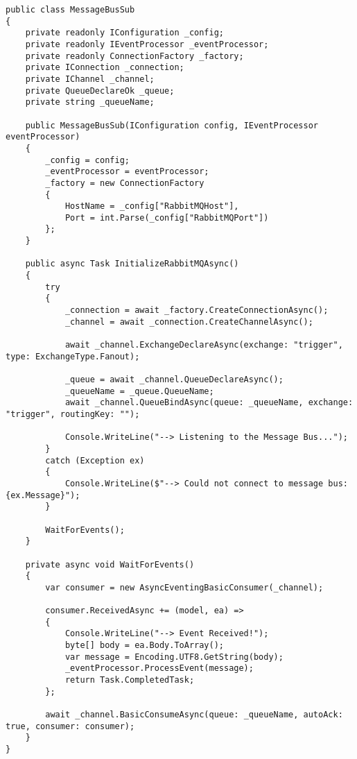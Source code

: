 \begin{lstlisting}[style=mystyleA, caption=MessageBusSub.cs (Microservice), label=lst:MicroMessageBusSb]
public class MessageBusSub
{
	private readonly IConfiguration _config;
	private readonly IEventProcessor _eventProcessor;
	private readonly ConnectionFactory _factory;
	private IConnection _connection;
	private IChannel _channel;
	private QueueDeclareOk _queue;
	private string _queueName;
	
	public MessageBusSub(IConfiguration config, IEventProcessor eventProcessor)
	{
		_config = config;
		_eventProcessor = eventProcessor;
		_factory = new ConnectionFactory
		{
			HostName = _config["RabbitMQHost"],
			Port = int.Parse(_config["RabbitMQPort"])
		};
	}
	
	public async Task InitializeRabbitMQAsync()
	{
		try
		{
			_connection = await _factory.CreateConnectionAsync();
			_channel = await _connection.CreateChannelAsync();
			
			await _channel.ExchangeDeclareAsync(exchange: "trigger", type: ExchangeType.Fanout);
			
			_queue = await _channel.QueueDeclareAsync();
			_queueName = _queue.QueueName;
			await _channel.QueueBindAsync(queue: _queueName, exchange: "trigger", routingKey: "");
			
			Console.WriteLine("--> Listening to the Message Bus...");
		}
		catch (Exception ex)
		{
			Console.WriteLine($"--> Could not connect to message bus: {ex.Message}");
		}
		
		WaitForEvents();
	}
	
	private async void WaitForEvents()
	{
		var consumer = new AsyncEventingBasicConsumer(_channel);
		
		consumer.ReceivedAsync += (model, ea) =>
		{
			Console.WriteLine("--> Event Received!");
			byte[] body = ea.Body.ToArray();
			var message = Encoding.UTF8.GetString(body);
			_eventProcessor.ProcessEvent(message);
			return Task.CompletedTask;
		};
		
		await _channel.BasicConsumeAsync(queue: _queueName, autoAck: true, consumer: consumer);
	}
}
\end{lstlisting}

